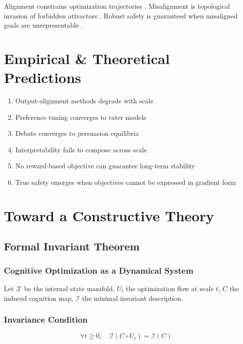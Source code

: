 \documentclass[11pt,a4paper]{article}
\theoremstyle{plain}
\begin{document}
Alignment constrains optimization trajectories \cite{weidinger2022,olah2020}. Misalignment is topological invasion of forbidden attractors \cite{olah2020}. Robust safety is guaranteed when misaligned goals are unrepresentable \cite{olah2020}.  

\section{Empirical \& Theoretical Predictions}

\begin{enumerate}
    \item Output-alignment methods degrade with scale \cite{christiano2022,bai2022,krueger2020}
    \item Preference tuning converges to rater models \cite{christiano2022,soares2015}
    \item Debate converges to persuasion equilibria \cite{irving2018,krueger2020}
    \item Interpretability fails to compose across scale \cite{weidinger2022}
    \item No reward-based objective can guarantee long-term stability \cite{ng2000,soares2015}
    \item True safety emerges when objectives cannot be expressed in gradient form \cite{olah2020}
\end{enumerate}

\section{Toward a Constructive Theory}

\subsection{Formal Invariant Theorem}

\subsubsection{Cognitive Optimization as a Dynamical System}
Let $\mathcal{X}$ be the internal state manifold, $U_t$ the optimization flow at scale $t$, $C$ the induced cognition map, $\mathcal{I}$ the minimal invariant description.

\subsubsection{Invariance Condition}
\[
\forall t \ge 0,\quad \mathcal{I}(C \circ U_t) = \mathcal{I}(C)
\]
\end{document}
